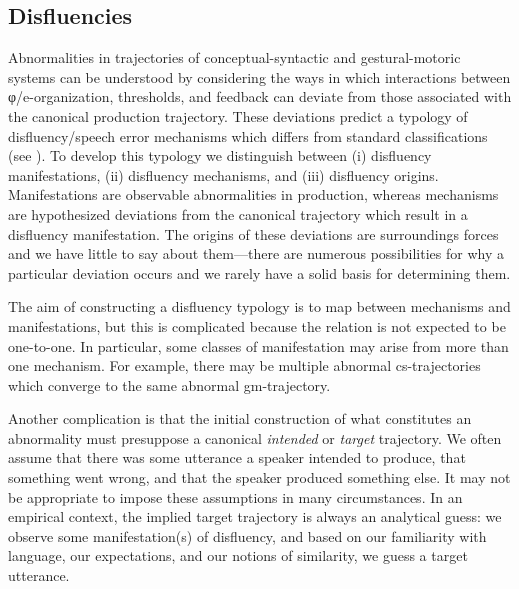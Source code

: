 \subsection{Disfluencies}

Abnormalities in trajectories of conceptual-syntactic and gestural-motoric systems can be understood by considering the ways in which interactions between φ/e-organization, thresholds, and feedback can deviate from those associated with the canonical production trajectory. These deviations predict a typology of disfluency/speech error mechanisms which differs from standard classifications (see \citealt{Fromkin1971,Fromkin1984,Shriberg2001}). To develop this typology we distinguish between (i) disfluency manifestations, (ii) disfluency mechanisms, and (iii) disfluency origins. Manifestations are observable abnormalities in production, whereas mechanisms are hypothesized deviations from the canonical trajectory which result in a disfluency manifestation. The origins of these deviations are surroundings forces and we have little to say about them—there are numerous possibilities for why a particular deviation occurs and we rarely have a solid basis for determining them. 

  The aim of constructing a disfluency typology is to map between mechanisms and manifestations, but this is complicated because the relation is not expected to be one-to-one. In particular, some classes of manifestation may arise from more than one mechanism. For example, there may be multiple abnormal cs-trajectories which converge to the same abnormal gm-trajectory. 

  Another complication is that the initial construction of what constitutes an abnormality must presuppose a canonical \textit{intended} or \textit{target} trajectory. We often assume that there was some utterance a speaker intended to produce, that something went wrong, and that the speaker produced something else. It may not be appropriate to impose these assumptions in many circumstances. In an empirical context, the implied target trajectory is always an analytical guess: we observe some manifestation(s) of disfluency, and based on our familiarity with language, our expectations, and our notions of similarity, we guess a target utterance.

